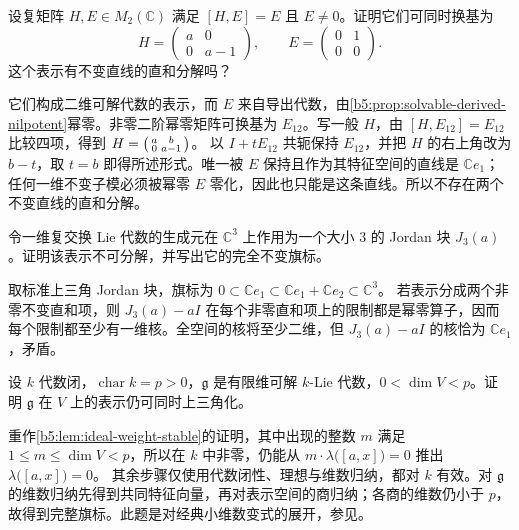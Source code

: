 \begin{exercise}\label{b5:ex:12-two-dimensional-affine}
	设复矩阵 \(H,E\in M_2(\mathbb C)\) 满足 \([H,E]=E\) 且 \(E\ne0\)。证明它们可同时换基为
	\[
		H=\begin{pmatrix}a&0\\0&a-1\end{pmatrix},\qquad
		E=\begin{pmatrix}0&1\\0&0\end{pmatrix}.
	\]
	这个表示有不变直线的直和分解吗？
\end{exercise}
\begin{solution}
	它们构成二维可解代数的表示，而 \(E\) 来自导出代数，由\cref{b5:prop:solvable-derived-nilpotent}幂零。非零二阶幂零矩阵可换基为 \(E_{12}\)。写一般 \(H\)，由 \([H,E_{12}]=E_{12}\) 比较四项，得到
	\(H=\begin{psmallmatrix}a&b\\0&a-1\end{psmallmatrix}\)。
	以 \(I+tE_{12}\) 共轭保持 \(E_{12}\)，并把 \(H\) 的右上角改为 \(b-t\)，取 \(t=b\) 即得所述形式。唯一被 \(E\) 保持且作为其特征空间的直线是 \(\mathbb Ce_1\)；任何一维不变子模必须被幂零 \(E\) 零化，因此也只能是这条直线。所以不存在两个不变直线的直和分解。
\end{solution}

\begin{exercise}\label{b5:ex:12-jordan-solvable}
	令一维复交换 Lie 代数的生成元在 \(\mathbb C^3\) 上作用为一个大小 \(3\) 的 Jordan 块 \(J_3(a)\)。证明该表示不可分解，并写出它的完全不变旗标。
\end{exercise}
\begin{solution}
	取标准上三角 Jordan 块，旗标为 \(0\subset\mathbb Ce_1\subset\mathbb Ce_1+\mathbb Ce_2\subset\mathbb C^3\)。 若表示分成两个非零不变直和项，则 \(J_3(a)-aI\) 在每个非零直和项上的限制都是幂零算子，因而每个限制都至少有一维核。全空间的核将至少二维，但 \(J_3(a)-aI\) 的核恰为 \(\mathbb Ce_1\)，矛盾。
\end{solution}

\begin{exercise}\label{b5:ex:12-small-positive-dimension}
	设 \(k\) 代数闭，\(\operatorname{char}k=p>0\)，\(\mathfrak g\) 是有限维可解 \(k\)-Lie 代数，\(0<\dim V<p\)。证明 \(\mathfrak g\) 在 \(V\) 上的表示仍可同时上三角化。
\end{exercise}
\begin{solution}
	重作\cref{b5:lem:ideal-weight-stable}的证明，其中出现的整数 \(m\) 满足 \(1\le m\le\dim V<p\)，所以在 \(k\) 中非零，仍能从 \(m\cdot\lambda\bigl([a,x]\bigr)=0\) 推出 \(\lambda\bigl([a,x]\bigr)=0\)。 其余步骤仅使用代数闭性、理想与维数归纳，都对 \(k\) 有效。对 \(\mathfrak g\) 的维数归纳先得到共同特征向量，再对表示空间的商归纳；各商的维数仍小于 \(p\)，故得到完整旗标。此题是对经典小维数变式的展开，参见\cite[Section 4, Exercise 2, p.~20]{Humphreys1972LieAlgebras}。
\end{solution}

